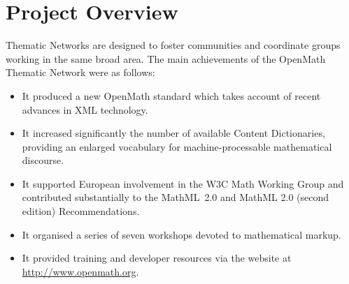 \chapter{Project Overview}

Thematic Networks are designed to foster communities and coordinate
groups working in the same broad area.  The main achievements of the
OpenMath Thematic Network were as follows:

\begin{itemize}

\item It produced a new OpenMath standard which takes account of recent
advances in XML technology.

\item It increased significantly the number of available Content
Dictionaries, providing an enlarged vocabulary for machine-processable
mathematical discourse.

\item It supported European involvement in the W3C Math Working Group
and contributed substantially to the MathML~2.0 and MathML 2.0 (second
edition) Recommendations.

\item It organised a series of seven workshops devoted to mathematical
markup.

\item It provided training and developer resources via the website at
\url{http://www.openmath.org}.

\end{itemize}

